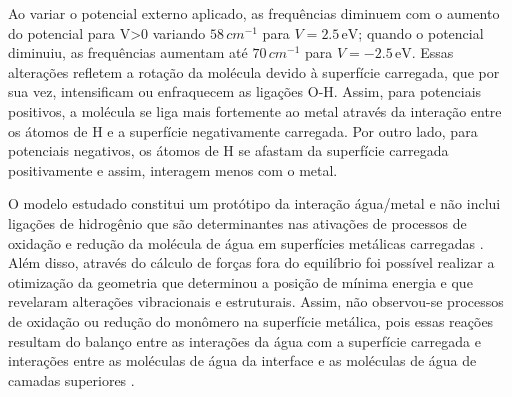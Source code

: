 Ao variar o potencial externo aplicado, as frequências diminuem com o aumento do potencial para V>0 variando $ 58\,\si{cm}^{-1} $ para $ V=2.5\,\si{\eV} $; quando o potencial diminuiu, as frequências aumentam até $ 70\,\si{cm}^{-1}$ para $ V=-2.5\,\si{\eV} $. Essas alterações refletem a rotação da molécula devido à superfície carregada, que por sua vez, intensificam ou enfraquecem as ligações O-H. Assim, para potenciais positivos, a molécula se liga mais fortemente ao metal através da interação entre os átomos de H e a superfície negativamente carregada. Por outro lado, para potenciais negativos, os átomos de H se afastam da superfície carregada positivamente e assim, interagem menos com o metal.



O modelo estudado constitui um protótipo da interação água/metal e não inclui ligações de hidrogênio que são determinantes nas ativações de processos de oxidação e redução da molécula de água em superfícies metálicas carregadas \cite{bias-pd}. Além disso, através do cálculo de forças fora do equilíbrio foi possível realizar a otimização da geometria que determinou a posição de mínima energia e que revelaram alterações vibracionais e estruturais. Assim, não observou-se processos de oxidação ou redução do monômero na superfície metálica, pois essas reações resultam do balanço entre as interações da água com a superfície carregada e interações entre as moléculas de água da interface e as moléculas de água de camadas superiores \cite{pd_bias_exp,pd_bias_exp2,pd_bias_exp3}. %

 




